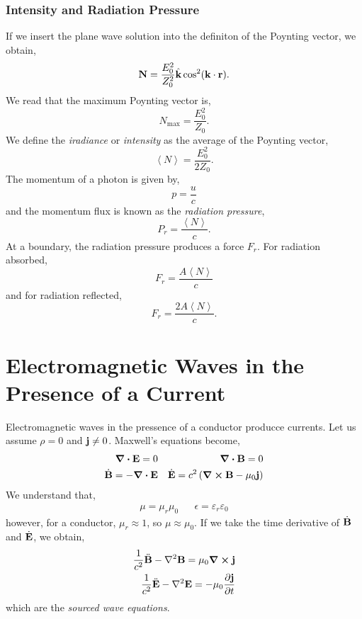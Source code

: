 \documentclass{book}
\begin{document}
\subsubsection{Intensity and Radiation Pressure}
If we insert the plane wave solution into the definiton of the Poynting vector, we obtain,
\begin{equation}
	\vb{N} = \frac{E_0^2}{Z_0^2}\hat{\vb{k}}\cos^2(\vb{k}\cdot{\vb{r}}).
\end{equation}
We read that the maximum Poynting vector is,
\begin{equation}
	N_{\text{max}} = \frac{E_0^2}{Z_0}.
\end{equation}
We define the \textit{iradiance} or \textit{intensity} as the average of the Poynting vector,
\begin{equation}
	\left<N\right> = \frac{E_0^2}{2Z_0}.
\end{equation}
The momentum of a photon is given by,
\begin{equation}
	p = \frac{u}{c}
\end{equation}
and the momentum flux is known as the \textit{radiation pressure},
\begin{equation}
	P_r = \frac{\left<N\right>}{c}.
\end{equation}
At a boundary, the radiation pressure produces a force $F_r$. For radiation absorbed,
\begin{equation}
	F_r = \frac{A\left<N\right>}{c}
\end{equation}
and for radiation reflected,
\begin{equation}
	F_r = \frac{2A\left<N\right>}{c}.
\end{equation}
\section{Electromagnetic Waves in the Presence of a Current}
Electromagnetic waves in the pressence of a conductor producce currents. Let us assume $\rho = 0$ and $\vb{j} \neq 0$. Maxwell's equations become,
\begin{align}
	\div{\vb{E}} = 0 && \div{\vb{B}} = 0 \\
	\Dot{\vb{B}} = -\div{\vb{E}} && \Dot{\vb{E}} = c^2\left(\curl{\vb{B}} - \mu_0\vb{j}\right)
\end{align}
We understand that,
\begin{align}
	\mu = \mu_r\mu_0 && \epsilon = \varepsilon_r \varepsilon_0 
\end{align}
however, for a conductor, $\mu_r \approx 1$, so $\mu \approx \mu_0$. If we take the time derivative of $\Dot{\vb{B}}$ and $\Dot{\vb{E}}$, we obtain,
\begin{align}
	\frac{1}{c^2}\Ddot{\vb{B}} - \laplacian{\vb{B}} = \mu_0\curl{\vb{j}} \label{eq:sourced E}\\
	\frac{1}{c^2}\Ddot{\vb{E}} - \laplacian{\vb{E}} = -\mu_0 \pdv{\vb{j}}{t}
\end{align}
which are the \textit{sourced wave equations}.
\end{document}
